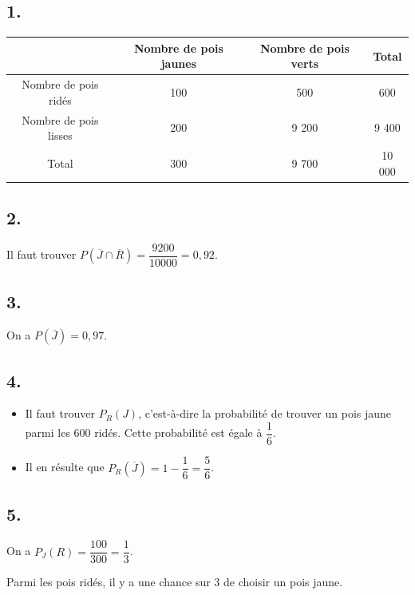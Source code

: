 \subsection*{1.}

\begin{center}
\begin{tabular}{|c|c|c|c|}
\hline
 & Nombre de pois jaunes & Nombre de pois verts & Total \\ \hline
Nombre de pois ridés  & 100  & 500  & 600   \\ \hline
Nombre de pois lisses & 200  & 9 200 & 9 400 \\ \hline
Total                 & 300  & 9 700 & 10 000 \\ \hline
\end{tabular}
\end{center}

\subsection*{2.}

Il faut trouver \(P(\overline{J} \cap \overline{R}) = \dfrac{9200}{10000} = 0,92\).

\subsection*{3.}

On a \(P(\overline{J}) = 0,97\).

\subsection*{4.}

\begin{itemize}
    \item Il faut trouver \(P_R(J)\), c'est-à-dire la probabilité de trouver un pois jaune parmi les 600 ridés. Cette probabilité est égale à \(\dfrac{1}{6}\).
    \item Il en résulte que \(P_R(\overline{J}) = 1 - \dfrac{1}{6} = \dfrac{5}{6}\).
\end{itemize}

\subsection*{5.}

On a \(P_J(R) = \dfrac{100}{300} = \dfrac{1}{3}\).

Parmi les pois ridés, il y a une chance sur 3 de choisir un pois jaune.

